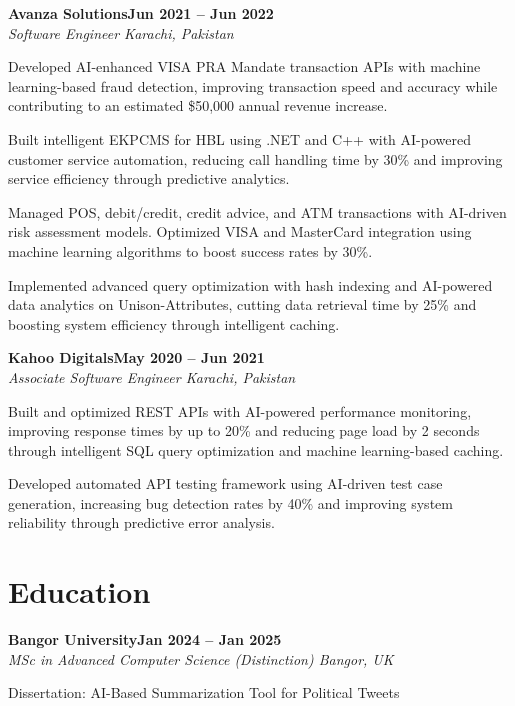 \documentclass[letterpaper,10pt]{article}
\newcommand{\headingBf}[2]{
  \hspace{10pt}\textbf{#1}\hfill\textbf{#2}\\
}
\newcommand{\headingIt}[2]{
  \hspace{10pt}\textit{#1}\hfill\textit{#2}\\
}
\newenvironment{resume_list}{
  \vspace{-7pt}
  \begin{itemize}[itemsep=-2px, parsep=1pt, leftmargin=30pt]
}{
  \end{itemize}
}
\begin{document}
\headingBf{Avanza Solutions}{Jun 2021 -- Jun 2022}
\headingIt{Software Engineer \hfill Karachi, Pakistan}{}
\begin{resume_list}
    \item Developed AI-enhanced VISA PRA Mandate transaction APIs with machine learning-based fraud detection, improving transaction speed and accuracy while contributing to an estimated \$50,000 annual revenue increase.
    \item Built intelligent EKPCMS for HBL using .NET and C++ with AI-powered customer service automation, reducing call handling time by 30\% and improving service efficiency through predictive analytics.
    \item Managed POS, debit/credit, credit advice, and ATM transactions with AI-driven risk assessment models. Optimized VISA and MasterCard integration using machine learning algorithms to boost success rates by 30\%.
    \item Implemented advanced query optimization with hash indexing and AI-powered data analytics on Unison-Attributes, cutting data retrieval time by 25\% and boosting system efficiency through intelligent caching.
\end{resume_list}

\headingBf{Kahoo Digitals}{May 2020 -- Jun 2021}
\headingIt{Associate Software Engineer \hfill Karachi, Pakistan}{}
\begin{resume_list}
    \item Built and optimized REST APIs with AI-powered performance monitoring, improving response times by up to 20\% and reducing page load by 2 seconds through intelligent SQL query optimization and machine learning-based caching.
    \item Developed automated API testing framework using AI-driven test case generation, increasing bug detection rates by 40\% and improving system reliability through predictive error analysis.
\end{resume_list}

\section{Education}

\headingBf{Bangor University}{Jan 2024 -- Jan 2025}
\headingIt{MSc in Advanced Computer Science (Distinction) \hfill Bangor, UK}{}
\begin{resume_list}
    \item Dissertation: AI-Based Summarization Tool for Political Tweets
\end{resume_list}
\end{document}
